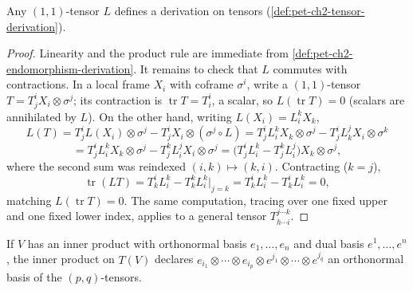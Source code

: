\begin{proposition}
  \label{prop:pet-ch2-endomorphism-is-derivation}
  \leanok
  Any $(1,1)$-tensor $L$ defines a derivation on tensors
  (\cref{def:pet-ch2-tensor-derivation}).
\end{proposition}
\begin{proof}
  \leanok
  Linearity and the product rule are immediate from
  \cref{def:pet-ch2-endomorphism-derivation}. It remains to check that $L$
  commutes with contractions. In a local frame $X_i$ with coframe $\sigma^i$,
  write a $(1,1)$-tensor $T=T^i_jX_i\otimes\sigma^j$; its contraction is
  $\operatorname{tr}T=T^i_i$, a scalar, so $L(\operatorname{tr}T)=0$ (scalars
  are annihilated by $L$). On the other hand, writing $L(X_i)=L^k_iX_k$,
  \[
    L(T) = T^i_jL(X_i)\otimes\sigma^j-T^i_jX_i\otimes(\sigma^j\circ L)
    = T^i_jL^k_iX_k\otimes\sigma^j-T^i_jL^j_kX_i\otimes\sigma^k
  \]
  \[
    = T^i_jL^k_iX_k\otimes\sigma^j-T^k_jL^j_iX_i\otimes\sigma^j
    = \big(T^i_jL^k_i-T^k_jL^j_i\big)X_k\otimes\sigma^j,
  \]
  where the second sum was reindexed $(i,k)\mapsto(k,i)$. Contracting
  ($k=j$),
  \[
    \operatorname{tr}(LT) = T^i_kL^k_i-T^k_kL^k_i\big|_{j=k}
    = T^i_kL^k_i-T^i_kL^k_i = 0,
  \]
  matching $L(\operatorname{tr}T)=0$. The same computation, tracing over one
  fixed upper and one fixed lower index, applies to a general tensor
  $T^{j\cdots k}_{h\cdots i}$.
\end{proof}

\begin{definition}
  \label{def:pet-ch2-tensor-algebra-inner-product}
  \leanok
  If $V$ has an inner product with orthonormal basis $e_1,\dots,e_n$ and dual
  basis $e^1,\dots,e^n$, the inner product on $T(V)$ declares
  $e_{i_1}\otimes\cdots\otimes e_{i_p}\otimes e^{j_1}\otimes\cdots\otimes e^{j_q}$
  an orthonormal basis of the $(p,q)$-tensors.
\end{definition}

